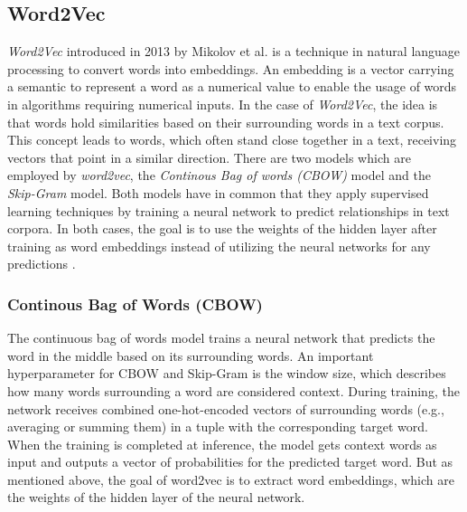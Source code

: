 \documentclass[
    fontsize=12pt,
    headings=small,
    parskip=half,           %
    bibliography=totoc,
    numbers=noenddot,       %
    open=any,               %
    ]{scrreprt}
\begin{document}
\subsection{Word2Vec}
\emph{Word2Vec} introduced in 2013 by Mikolov et al. is a technique in natural language processing to convert words into embeddings. An embedding is a vector carrying a semantic to represent a word as a numerical value to enable the usage of words in algorithms requiring numerical inputs. In the case of \emph{Word2Vec}, the idea is that words hold similarities based on their surrounding words in a text corpus. This concept leads to words, which often stand close together in a text, receiving vectors that point in a similar direction. There are two models which are employed by \emph{word2vec}, the \emph{Continous Bag of words (CBOW)} model and the \emph{Skip-Gram} model. Both models have in common that they apply supervised learning techniques by training a neural network to predict relationships in text corpora. In both cases, the goal is to use the weights of the hidden layer after training as word embeddings instead of utilizing the neural networks for any predictions \cite{mikolov2013efficient} \cite{rong2014word2vec}.

\subsubsection{Continous Bag of Words (CBOW)}
The continuous bag of words model trains a neural network that predicts the word in the middle based on its surrounding words. An important hyperparameter for CBOW and Skip-Gram is the window size, which describes how many words surrounding a word are considered context. 
During training, the network receives combined one-hot-encoded vectors of surrounding words (e.g., averaging or summing them) in a tuple with the corresponding target word. When the training is completed at inference, the model gets context words as input and outputs a vector of probabilities for the predicted target word. But as mentioned above, the goal of word2vec is to extract word embeddings, which are the weights of the hidden layer of the neural network.
\end{document}
